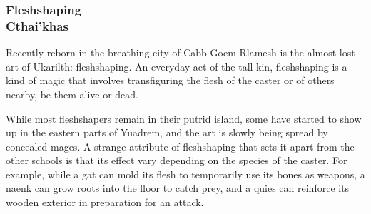 \subsubsection{Fleshshaping\\ \small{Cthai'khas}} %
Recently reborn in the breathing city of Cabb Goem-Rlamesh is the almost lost art of Ukarilth: fleshshaping.
An everyday act of the tall kin, fleshshaping is a kind of magic that involves transfiguring the flesh of the caster or of others nearby, be them alive or dead.

While most fleshshapers remain in their putrid island, some have started to show up in the eastern parts of Yuadrem, and the art is slowly being spread by concealed mages.
A strange attribute of fleshshaping that sets it apart from the other schools is that its effect vary depending on the species of the caster.
For example, while a gat can mold its flesh to temporarily use its bones as weapons, a naenk can grow roots into the floor to catch prey, and a quies can reinforce its wooden exterior in preparation for an attack.
